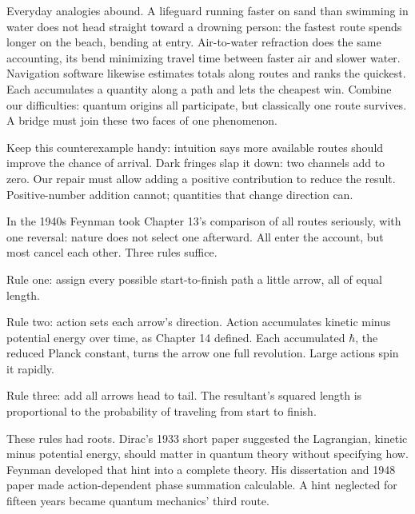 Everyday analogies abound. A lifeguard running faster on sand than swimming in water does not head straight toward a drowning person: the fastest route spends longer on the beach, bending at entry. Air-to-water refraction does the same accounting, its bend minimizing travel time between faster air and slower water. Navigation software likewise estimates totals along routes and ranks the quickest. Each accumulates a quantity along a path and lets the cheapest win. Combine our difficulties: quantum origins all participate, but classically one route survives. A bridge must join these two faces of one phenomenon.

Keep this counterexample handy: intuition says more available routes should improve the chance of arrival. Dark fringes slap it down: two channels add to zero. Our repair must allow adding a positive contribution to reduce the result. Positive-number addition cannot; quantities that change direction can.


In the 1940s Feynman took Chapter 13's comparison of all routes seriously, with one reversal: nature does not select one afterward. All enter the account, but most cancel each other. Three rules suffice.

Rule one: assign every possible start-to-finish path a little arrow, all of equal length.

Rule two: action sets each arrow's direction. Action accumulates kinetic minus potential energy over time, as Chapter 14 defined. Each accumulated \(\hbar\), the reduced Planck constant, turns the arrow one full revolution. Large actions spin it rapidly.

Rule three: add all arrows head to tail. The resultant's squared length is proportional to the probability of traveling from start to finish.

These rules had roots. Dirac's 1933 short paper suggested the Lagrangian, kinetic minus potential energy, should matter in quantum theory without specifying how. Feynman developed that hint into a complete theory. His dissertation and 1948 paper made action-dependent phase summation calculable. A hint neglected for fifteen years became quantum mechanics' third route.

\begin{center}
\end{center}

